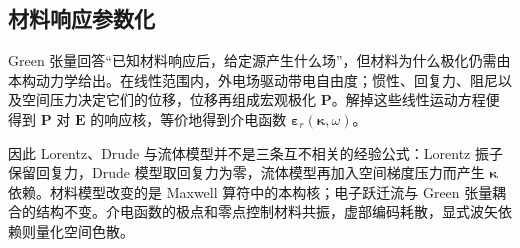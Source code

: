 \subsection{材料响应参数化}

Green 张量回答“已知材料响应后，给定源产生什么场”，但材料为什么极化仍需由本构动力学给出。在线性范围内，外电场驱动带电自由度；惯性、回复力、阻尼以及空间压力决定它们的位移，位移再组成宏观极化 $\mathbf P$。解掉这些线性运动方程便得到 $\mathbf P$ 对 $\mathbf E$ 的响应核，等价地得到介电函数 $\boldsymbol\varepsilon_r(\boldsymbol\kappa,\omega)$。

因此 Lorentz、Drude 与流体模型并不是三条互不相关的经验公式：Lorentz 振子保留回复力，Drude 模型取回复力为零，流体模型再加入空间梯度压力而产生 $\boldsymbol\kappa$ 依赖。材料模型改变的是 Maxwell 算符中的本构核；电子跃迁流与 Green 张量耦合的结构不变。介电函数的极点和零点控制材料共振，虚部编码耗散，显式波矢依赖则量化空间色散。

